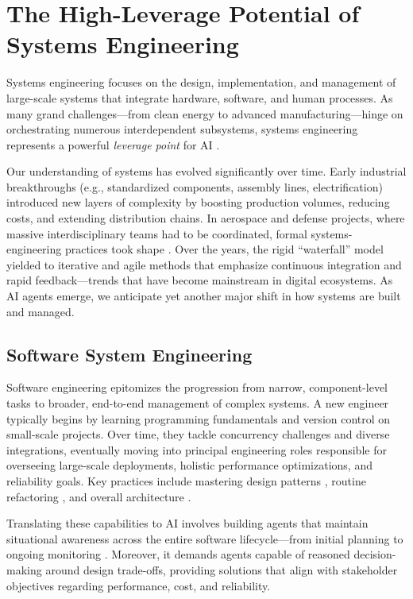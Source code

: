 \section{The High-Leverage Potential of Systems Engineering}
Systems engineering focuses on the design, implementation, and management of large-scale systems that integrate hardware, software, and human processes. As many grand challenges—from clean energy to advanced manufacturing—hinge on orchestrating numerous interdependent subsystems, systems engineering represents a powerful \textit{leverage point} for AI \cite{buede2016}.

Our understanding of systems has evolved significantly over time. Early industrial breakthroughs (e.g., standardized components, assembly lines, electrification) introduced new layers of complexity by boosting production volumes, reducing costs, and extending distribution chains. In aerospace and defense projects, where massive interdisciplinary teams had to be coordinated, formal systems-engineering practices took shape \cite{madni2018}. Over the years, the rigid “waterfall” model yielded to iterative and agile methods that emphasize continuous integration and rapid feedback—trends that have become mainstream in digital ecosystems. As AI agents emerge, we anticipate yet another major shift in how systems are built and managed.

\subsection{Software System Engineering}
Software engineering epitomizes the progression from narrow, component-level tasks to broader, end-to-end management of complex systems. A new engineer typically begins by learning programming fundamentals and version control on small-scale projects. Over time, they tackle concurrency challenges and diverse integrations, eventually moving into principal engineering roles responsible for overseeing large-scale deployments, holistic performance optimizations, and reliability goals. Key practices include mastering design patterns \cite{gamma1994design, pressman2010}, routine refactoring \cite{humphrey1989, fowler1999refactoring}, and overall architecture \cite{shaw1996software, bass2012architecture}.

Translating these capabilities to AI involves building agents that maintain situational awareness across the entire software lifecycle—from initial planning to ongoing monitoring \cite{blanchard2010}. Moreover, it demands agents capable of reasoned decision-making around design trade-offs, providing solutions that align with stakeholder objectives regarding performance, cost, and reliability.

